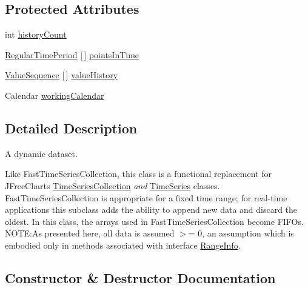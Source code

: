 \subsection*{Protected Attributes}
\begin{DoxyCompactItemize}
\item 
int \mbox{\hyperlink{classorg_1_1jfree_1_1data_1_1time_1_1_dynamic_time_series_collection_aad8926b87366b84034d09bea893e0c0e}{history\+Count}}
\item 
\mbox{\hyperlink{classorg_1_1jfree_1_1data_1_1time_1_1_regular_time_period}{Regular\+Time\+Period}} \mbox{[}$\,$\mbox{]} \mbox{\hyperlink{classorg_1_1jfree_1_1data_1_1time_1_1_dynamic_time_series_collection_a3579683247506ae81816c9a839465ede}{points\+In\+Time}}
\item 
\mbox{\hyperlink{classorg_1_1jfree_1_1data_1_1time_1_1_dynamic_time_series_collection_1_1_value_sequence}{Value\+Sequence}} \mbox{[}$\,$\mbox{]} \mbox{\hyperlink{classorg_1_1jfree_1_1data_1_1time_1_1_dynamic_time_series_collection_a3823ae6f83ca54d5e730fb82b7eb17f7}{value\+History}}
\item 
Calendar \mbox{\hyperlink{classorg_1_1jfree_1_1data_1_1time_1_1_dynamic_time_series_collection_a3cabbbf6b6524b3a5acd9e55f085ca15}{working\+Calendar}}
\end{DoxyCompactItemize}


\subsection{Detailed Description}
A dynamic dataset. 

Like Fast\+Time\+Series\+Collection, this class is a functional replacement for J\+Free\+Chart\textquotesingle{}s \mbox{\hyperlink{classorg_1_1jfree_1_1data_1_1time_1_1_time_series_collection}{Time\+Series\+Collection}} {\itshape and} \mbox{\hyperlink{classorg_1_1jfree_1_1data_1_1time_1_1_time_series}{Time\+Series}} classes. Fast\+Time\+Series\+Collection is appropriate for a fixed time range; for real-\/time applications this subclass adds the ability to append new data and discard the oldest. In this class, the arrays used in Fast\+Time\+Series\+Collection become F\+I\+FO\textquotesingle{}s. N\+O\+TE\+:As presented here, all data is assumed $>$= 0, an assumption which is embodied only in methods associated with interface \mbox{\hyperlink{interfaceorg_1_1jfree_1_1data_1_1_range_info}{Range\+Info}}. 

\subsection{Constructor \& Destructor Documentation}
\mbox{\label{classorg_1_1jfree_1_1data_1_1time_1_1_dynamic_time_series_collection_a394b0423333f069e0085afe6c706e599}} 
